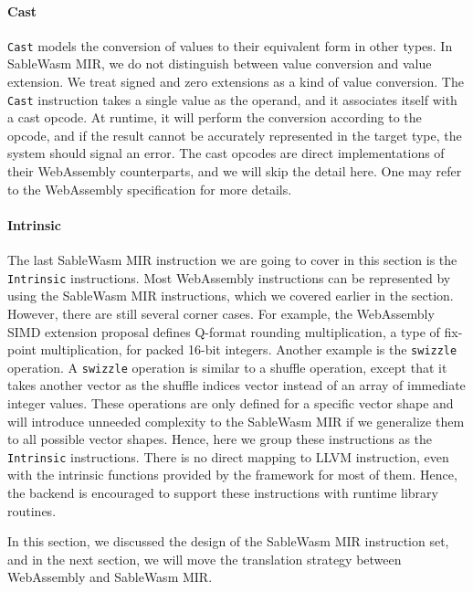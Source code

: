 \paragraph{Cast}
\texttt{Cast} models the conversion of values to their equivalent form in other
types. In SableWasm MIR, we do not distinguish between value conversion and
value extension. We treat signed and zero extensions as a kind of value
conversion. The \texttt{Cast} instruction takes a single value as the operand,
and it associates itself with a cast opcode. At runtime, it will perform the
conversion according to the opcode, and if the result cannot be accurately
represented in the target type, the system should signal an error. The cast
opcodes are direct implementations of their WebAssembly counterparts, and we
will skip the detail here. One may refer to the WebAssembly specification for
more details.

\paragraph{Intrinsic}
The last SableWasm MIR instruction we are going to cover in this section is the
\texttt{Intrinsic} instructions. Most WebAssembly instructions can be
represented by using the SableWasm MIR instructions, which we covered earlier in
the section. However, there are still several corner cases. For example, the
WebAssembly SIMD extension proposal defines Q-format rounding multiplication, a
type of fix-point multiplication, for packed 16-bit integers. Another example is
the \texttt{swizzle} operation. A \texttt{swizzle} operation is similar to a
shuffle operation, except that it takes another vector as the shuffle indices
vector instead of an array of immediate integer values. These operations are
only defined for a specific vector shape and will introduce unneeded complexity
to the SableWasm MIR if we generalize them to all possible vector shapes. Hence,
here we group these instructions as the \texttt{Intrinsic} instructions. There
is no direct mapping to LLVM instruction, even with the intrinsic functions
provided by the framework for most of them. Hence, the backend is encouraged to
support these instructions with runtime library routines.

In this section, we discussed the design of the SableWasm MIR instruction set,
and in the next section, we will move the translation strategy between
WebAssembly and SableWasm MIR.